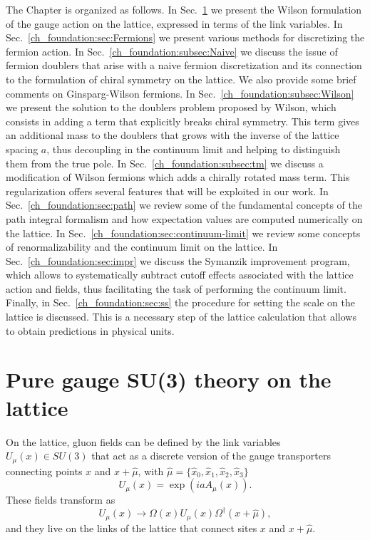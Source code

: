 The Chapter is organized as follows. In Sec.~\ref{ch_foundation:sec:Gauge} we present the Wilson formulation of the gauge action on the lattice, expressed in terms of the link variables. In Sec.~\ref{ch_foundation:sec:Fermions} we present various methods for discretizing the fermion action. In Sec.~\ref{ch_foundation:subsec:Naive} we discuss the issue of fermion doublers that arise with a naive fermion discretization and its connection to the formulation of chiral symmetry on the lattice. We also provide some brief comments on Ginsparg-Wilson fermions. In Sec.~\ref{ch_foundation:subsec:Wilson} we present the solution to the doublers problem proposed by Wilson, which consists in adding a term that explicitly breaks chiral symmetry. This term gives an additional mass to the doublers that grows with the inverse of the lattice spacing $a$, thus decoupling in the continuum limit and helping to distinguish them from the true pole. In Sec.~\ref{ch_foundation:subsec:tm} we discuss a modification of Wilson fermions which adds a chirally rotated mass term. This regularization offers several features that will be exploited in our work. In Sec.~\ref{ch_foundation:sec:path} we review some of the fundamental concepts of the path integral formalism and how expectation values are computed numerically on the lattice. In Sec.~\ref{ch_foundation:sec:continuum-limit} we review some concepts of renormalizability and the continuum limit on the lattice. In Sec.~\ref{ch_foundation:sec:impr} we discuss the Symanzik improvement program, which allows to systematically subtract cutoff effects associated with the lattice action and fields, thus facilitating the task of performing the continuum limit. Finally, in Sec.~\ref{ch_foundation:sec:ss} the procedure for setting the scale on the lattice is discussed. This is a necessary step of the lattice calculation that allows to obtain  predictions in physical units.


\section{Pure gauge SU(3) theory on the lattice}
\label{ch_foundation:sec:Gauge}

On the lattice, gluon fields can be defined by the link variables $U_{\mu}(x)\in SU(3)$ that act as a discrete version of the gauge transporters connecting points $x$ and $x+\hat{\mu}$, with $\hat{\mu}=\{\hat{x}_0,\hat{x}_1,\hat{x}_2,\hat{x}_3\}$
\begin{equation}
\label{ch_foundation:eq:U}
U_{\mu}(x)=\exp\left(iaA_{\mu}(x)\right).
\end{equation}
These fields transform as 
\begin{equation}
\label{ch_foundation:eq:U_transf}
U_{\mu}(x)\to\Omega(x)U_{\mu}(x)\Omega^{\dagger}(x+\hat{\mu}),
\end{equation}
and they live on the links of the lattice that connect sites $x$ and $x+\hat{\mu}$.

